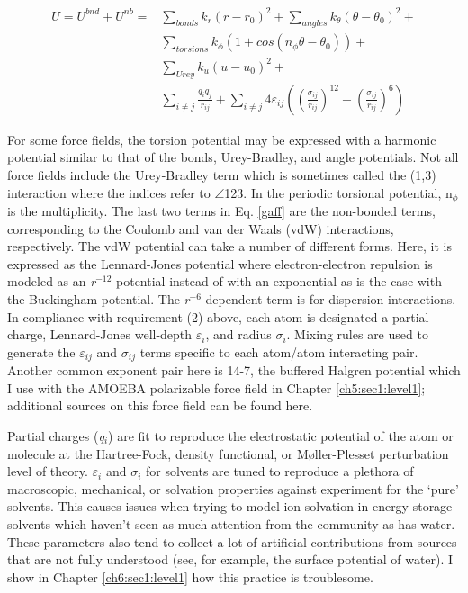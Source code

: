 \begin{theory}
  \begin{equation}\label{gaff}
   \begin{split}
      U = U^{bnd} + U^{nb} = &\sum_{bonds} k_{r}\left(r - r_{0}\right)^{2} + 
          \sum_{angles} k_{\theta}\left(\theta - \theta_{0}\right)^{2} + \\
          &\sum_{torsions} k_{\phi}\left(1 + cos\left(n_{\phi}\theta - \theta_{0}\right)\right) + \\
          &\sum_{Urey} k_{u}\left(u - u_{0}\right)^{2} + \\
          &\sum_{i\neq j} \frac{q_{i}q_{j}}{r_{ij}} + 
           \sum_{i\neq j} 4\varepsilon_{ij}\left(\left(\frac{\sigma_{ij}}{r_{ij}}\right)^{12} 
          - \left(\frac{\sigma_{ij}}{r_{ij}}\right)^{6}\right)
   \end{split}
  \end{equation}
  
  For some force fields, the torsion potential may be expressed with a harmonic potential similar to that 
  of the bonds, Urey-Bradley, and angle potentials. Not all force fields include the Urey-Bradley term which
  is sometimes called the (1,3) interaction where the indices refer to $\angle$123. In the periodic torsional
  potential, n$_{\phi}$ is the multiplicity. The last two terms in Eq. \ref{gaff} are the non-bonded terms,
  corresponding to the Coulomb and van der Waals (vdW) interactions, respectively. The vdW potential can take
  a number of different forms. Here, it is expressed as the Lennard-Jones potential where electron-electron
  repulsion is modeled as an \emph{r}$^{-12}$ potential instead of with an exponential as is the case with 
  the Buckingham potential. The \emph{r}$^{-6}$ dependent term is for dispersion interactions. In compliance
  with requirement (2) above, each atom is designated a partial charge, Lennard-Jones well-depth 
  $\varepsilon_{i}$, and radius $\sigma_{i}$. Mixing rules are used to generate the $\varepsilon_{ij}$ and
  $\sigma_{ij}$ terms specific to each atom/atom interacting pair. Another common exponent pair here is 14-7, 
  the buffered Halgren potential which I use with the AMOEBA polarizable force field in Chapter 
  \ref{ch5:sec1:level1}; additional sources on this force field can be found here\cite{laury2015revised}. 
  
  Partial charges (\emph{q}$_{i}$) are fit to reproduce the electrostatic potential of the atom or molecule at the
  Hartree-Fock, density functional, or M$\text{\o}$ller-Plesset perturbation level of theory. $\varepsilon_{i}$ and
  $\sigma_{i}$ for solvents are tuned to reproduce a plethora of macroscopic, mechanical, or solvation properties
  against experiment for the `pure' solvents. This causes issues when trying to model ion solvation in energy
  storage solvents which haven't seen as much attention from the community as has water. These parameters also
  tend to collect a lot of artificial contributions from sources that are not fully understood (see, for example,
  the surface potential of water). I show in Chapter \ref{ch6:sec1:level1} how this practice is troublesome.
  

\end{theory}
